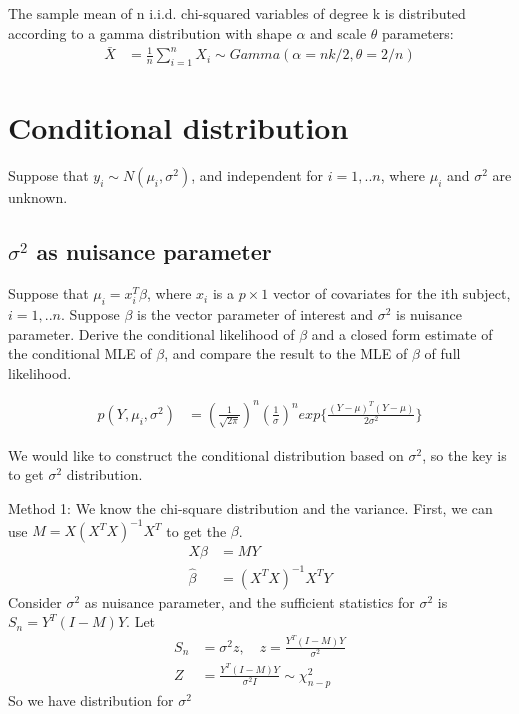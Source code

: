 \documentclass[11pt]{article} %
\begin{document}
The sample mean of n i.i.d. chi-squared variables of degree k is distributed according to a gamma distribution with shape $\alpha$  and scale $\theta$  parameters:
\begin{align*}
	\bar{X} &= \frac{1}{n} \sum_{i=1}^n X_i \sim Gamma(\alpha = nk/2, \theta = 2/n)
\end{align*}

\section{Conditional distribution}
Suppose that $y_i \sim N(\mu_i, \sigma^2)$, and independent for $i=1,..n$, where $\mu_i$ and $\sigma^2$ are unknown.

	
\subsection{$\sigma^2$ as nuisance parameter}
 Suppose that $\mu_i = x_i^T \beta$, where $x_i$ is a $p \times 1$ vector of covariates for the ith subject, $i=1,..n$. Suppose $\beta$ is the vector parameter of interest and $\sigma^2$ is nuisance parameter. Derive the conditional likelihood of $\beta$ and a closed form estimate of the conditional MLE of $\beta$, and compare the result to the MLE of $\beta$ of full likelihood.
	
	
\begin{align*}
	p{(Y, \mu_i, \sigma^2)} &= \left( \frac{1}{\sqrt{2\pi}} \right)^n \left( \frac{1}{\sigma}\right)^n exp\{ \frac{(Y-\mu)^T (Y-\mu)}{2 \sigma^2} \}
\end{align*}	
	
We would like to construct the conditional distribution based on $\sigma^2$, so the key is to get $\sigma^2$ distribution.

Method 1: We know the chi-square distribution and the variance. First, we can use $M= X(X^T X)^{-1}X^T$ to get the $\beta$.
\begin{align*}
	X\beta &= M Y \\
	\hat{\beta} &= (X^T X)^{-1}X^TY
\end{align*}	
Consider $\sigma^2$ as nuisance parameter, and the sufficient statistics for $\sigma^2$ is 
$S_n = Y^T(I-M)Y$. Let  
\begin{align*}
	S_n &= \sigma^2 z, \quad z = \frac{Y^T(I-M)Y}{\sigma^2} \\
	Z &= \frac{Y^T (I-M)Y}{\sigma^2 I}  \sim \chi^2_{n-p}
\end{align*}
So we have distribution for $\sigma^2$
\end{document}
